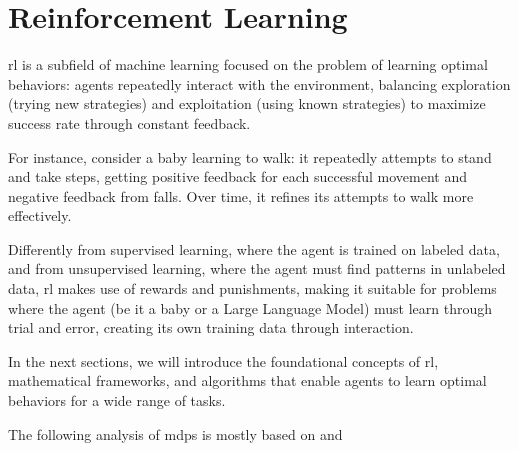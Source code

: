 
\chapter{Reinforcement Learning}

\gls{rl} is a subfield of machine learning focused on the problem of learning 
optimal behaviors: agents repeatedly interact with the environment, balancing 
exploration (trying new strategies) and exploitation (using known strategies) 
to maximize success rate through constant feedback. \

For instance, consider a baby learning to walk: it repeatedly attempts to stand 
and take steps, getting positive feedback for each successful movement and 
negative feedback from falls. Over time, it refines its attempts to walk 
more effectively. \

Differently from supervised learning, where the agent is trained on labeled data, 
and from unsupervised learning, where the agent must find patterns in unlabeled data,
\gls{rl} makes use of rewards and punishments, making it suitable for problems 
where the agent (be it a baby or a Large Language Model) must learn through trial and error, creating its own training data 
through interaction.


% 
% 
% 
% 

% 
% 
% 
% 
% 

In the next sections, we will introduce the foundational concepts of \gls{rl}, 
mathematical frameworks, and algorithms that enable agents to learn optimal behaviors for 
a wide range of tasks.

The following analysis of \glspl{mdp} is mostly based on \cite{d1afac99aad548188c9d47063c7109df} and \cite{Sutton1998}
